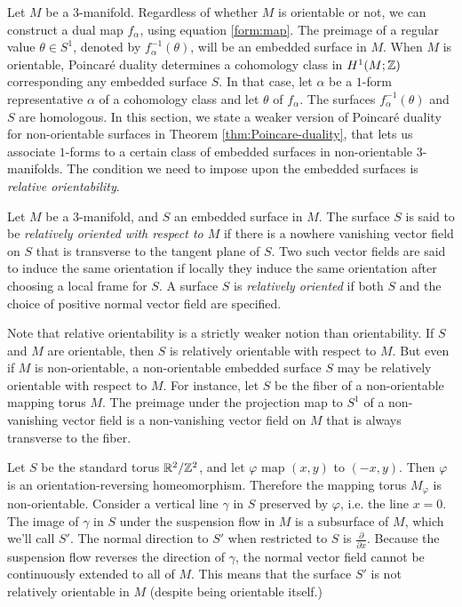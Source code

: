Let $M$ be a 3-manifold.  Regardless of whether $M$ is orientable or not, we can construct a dual map $f_\alpha$, using equation \eqref{form:map}.
The preimage of a regular value $\theta \in S^1$, denoted by $f_{\alpha}^{-1}(\theta)$, will be an embedded surface in $M$.
When $M$ is orientable, Poincar\'e duality determines a cohomology class in $H^1(M; \mathbb{Z})$ corresponding any embedded surface $S$.
In that case, let $\alpha$ be a $1$-form representative $\alpha$ of a cohomology class and let $\theta$ of $f_{\alpha}$.  The surfaces $f_{\alpha}^{-1}(\theta)$ and $S$ are homologous.
In this section, we state a weaker version of Poincar\'e duality for non-orientable surfaces in Theorem \ref{thm:Poincare-duality}, that lets us associate $1$-forms to a certain class of embedded surfaces in non-orientable $3$-manifolds.
The condition we need to impose upon the embedded surfaces is \emph{relative orientability}.

  Let $M$ be a $3$-manifold, and $S$ an embedded surface in $M$.
  The surface $S$ is said to be \emph{relatively oriented with respect to $M$} if there is a nowhere vanishing vector field on $S$ that is transverse to the tangent plane of $S$.
  Two such vector fields are said to induce the same orientation if locally they induce the same orientation after choosing a local frame for $S$.
  A surface $S$ is \emph{relatively oriented} if both $S$ and the choice of positive normal vector field are specified.

Note that relative orientability is a strictly weaker notion than orientability.
If $S$ and $M$ are orientable, then $S$ is relatively orientable with respect to $M$.
But even if $M$ is non-orientable, a non-orientable embedded surface $S$ may be relatively orientable with respect to $M$.
For instance, let $S$ be the fiber of a non-orientable mapping torus $M$.
The preimage under the projection map to $S^1$ of a non-vanishing vector field is a non-vanishing vector field on $M$ that is always transverse to the fiber.

  Let $S$ be the standard torus $\mathbb{R}^2/\mathbb{Z}^2$, and let $\varphi$ map $(x,y)$ to $(-x, y)$.
  Then $\varphi$ is an orientation-reversing homeomorphism.
  Therefore the mapping torus $M_\varphi$ is non-orientable.
  Consider a vertical line $\gamma$ in $S$ preserved by $\varphi$, i.e. the line
  $x = 0$.
  The image of $\gamma$ in $S$ under the suspension flow in $M$ is a subsurface of $M$, which we'll call $S'$.
  The normal direction to $S'$ when restricted to $S$ is $\frac{\partial}{\partial x}$.
  Because the suspension flow reverses the direction of $\gamma$, the normal vector field cannot be continuously extended to all of $M$.
  This means that the surface $S'$ is not relatively orientable in $M$ (despite being orientable itself.)

